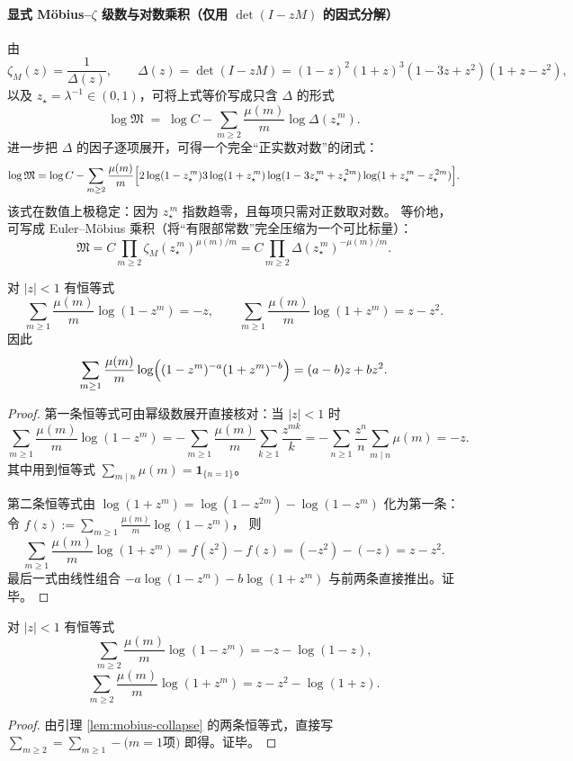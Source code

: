 \paragraph{显式 Möbius--$\zeta$ 级数与对数乘积（仅用 \texorpdfstring{$\det(I-zM)$}{det} 的因式分解）}
由
\[
\zeta_M(z)=\frac{1}{\Delta(z)},\qquad
\Delta(z)=\det(I-zM)=(1-z)^2(1+z)^3(1-3z+z^2)(1+z-z^2),
\]
以及 $z_\star=\lambda^{-1}\in(0,1)$，可将上式等价写成只含 $\Delta$ 的形式
\[
\log\mathfrak{M}
\;=\;
\log C-\sum_{m\ge 2}\frac{\mu(m)}{m}\log \Delta(z_\star^{\,m}).
\]
进一步把 $\Delta$ 的因子逐项展开，可得一个完全“正实数对数”的闭式：
\[
\log\mathfrak{M}
=\log C
-\sum_{m\ge 2}\frac{\mu(m)}{m}\Bigl[
2\log(1-z_\star^{\,m})
3\log(1+z_\star^{\,m})
\log(1-3z_\star^{\,m}+z_\star^{\,2m})
\log(1+z_\star^{\,m}-z_\star^{\,2m})
\Bigr].
\]
该式在数值上极稳定：因为 $z_\star^{\,m}$ 指数趋零，且每项只需对正数取对数。
等价地，可写成 Euler--Möbius 乘积（将“有限部常数”完全压缩为一个可比标量）：
\[
\mathfrak{M}
=C\prod_{m\ge 2}\zeta_M(z_\star^{\,m})^{\mu(m)/m}
=C\prod_{m\ge 2}\Delta(z_\star^{\,m})^{-\mu(m)/m}.
\]
\begin{lemma}\label{lem:mobius-collapse}
对 $|z|<1$ 有恒等式
\[
\sum_{m\ge 1}\frac{\mu(m)}{m}\log(1-z^m)=-z,\qquad
\sum_{m\ge 1}\frac{\mu(m)}{m}\log(1+z^m)=z-z^2.
\]
因此
\[
\sum_{m\ge 1}\frac{\mu(m)}{m}\log\Bigl((1-z^m)^{-a}(1+z^m)^{-b}\Bigr)=(a-b)z+bz^2.
\]
\end{lemma}

\begin{proof}
第一条恒等式可由幂级数展开直接核对：当 $|z|<1$ 时
\[
\sum_{m\ge 1}\frac{\mu(m)}{m}\log(1-z^m)
=-\sum_{m\ge 1}\frac{\mu(m)}{m}\sum_{k\ge 1}\frac{z^{mk}}{k}
=-\sum_{n\ge 1}\frac{z^n}{n}\sum_{m\mid n}\mu(m)
=-z.
\]
其中用到恒等式 $\sum_{m\mid n}\mu(m)=\mathbf{1}_{\{n=1\}}$。

第二条恒等式由
\(
\log(1+z^m)=\log(1-z^{2m})-\log(1-z^m)
\)
化为第一条：令
\(
f(z):=\sum_{m\ge 1}\frac{\mu(m)}{m}\log(1-z^m)
\)，
则
\[
\sum_{m\ge 1}\frac{\mu(m)}{m}\log(1+z^m)=f(z^2)-f(z)=(-z^2)-(-z)=z-z^2.
\]
最后一式由线性组合
\(
-a\log(1-z^m)-b\log(1+z^m)
\)
与前两条直接推出。证毕。
\end{proof}

\begin{lemma}[从 \texorpdfstring{$m\ge 2$}{m>=2} 开始的显式求和]\label{lem:mobius-collapse-mge2}
对 $|z|<1$ 有恒等式
\[
\sum_{m\ge 2}\frac{\mu(m)}{m}\log(1-z^m)=-z-\log(1-z),
\]
\[
\sum_{m\ge 2}\frac{\mu(m)}{m}\log(1+z^m)=z-z^2-\log(1+z).
\]
\end{lemma}
\begin{proof}
由引理 \ref{lem:mobius-collapse} 的两条恒等式，直接写
\(
\sum_{m\ge 2}=\sum_{m\ge 1}-\text{(}m=1\text{项)}
\)
即得。证毕。
\end{proof}

